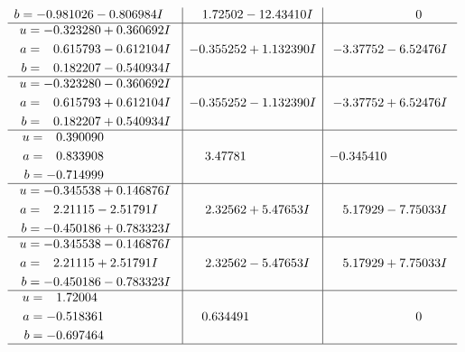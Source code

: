 \documentclass[1p]{elsarticle_modified}
\theoremstyle{definition}
\begin{document}
$$\begin{array}{c|c|c}
\begin{aligned}
b &= -0.981026 - 0.806984 I\end{aligned}
 & \phantom{-}1.72502 - 12.43410 I & \phantom{-0.000000 } 0 \\ \hline\begin{aligned}
u &= -0.323280 + 0.360692 I \\
a &= \phantom{-}0.615793 - 0.612104 I \\
b &= \phantom{-}0.182207 - 0.540934 I\end{aligned}
 & -0.355252 + 1.132390 I & -3.37752 - 6.52476 I \\ \hline\begin{aligned}
u &= -0.323280 - 0.360692 I \\
a &= \phantom{-}0.615793 + 0.612104 I \\
b &= \phantom{-}0.182207 + 0.540934 I\end{aligned}
 & -0.355252 - 1.132390 I & -3.37752 + 6.52476 I \\ \hline\begin{aligned}
u &= \phantom{-}0.390090\phantom{ +0.000000I} \\
a &= \phantom{-}0.833908\phantom{ +0.000000I} \\
b &= -0.714999\phantom{ +0.000000I}\end{aligned}
 & \phantom{-}3.47781\phantom{ +0.000000I} & -0.345410\phantom{ +0.000000I} \\ \hline\begin{aligned}
u &= -0.345538 + 0.146876 I \\
a &= \phantom{-}2.21115 - 2.51791 I \\
b &= -0.450186 + 0.783323 I\end{aligned}
 & \phantom{-}2.32562 + 5.47653 I & \phantom{-}5.17929 - 7.75033 I \\ \hline\begin{aligned}
u &= -0.345538 - 0.146876 I \\
a &= \phantom{-}2.21115 + 2.51791 I \\
b &= -0.450186 - 0.783323 I\end{aligned}
 & \phantom{-}2.32562 - 5.47653 I & \phantom{-}5.17929 + 7.75033 I \\ \hline\begin{aligned}
u &= \phantom{-}1.72004\phantom{ +0.000000I} \\
a &= -0.518361\phantom{ +0.000000I} \\
b &= -0.697464\phantom{ +0.000000I}\end{aligned}
 & \phantom{-}0.634491\phantom{ +0.000000I} & \phantom{-0.000000 } 0\\
 \hline 
 \end{array}$$\newpage\newpage\renewcommand{\arraystretch}{1}
\end{document}
